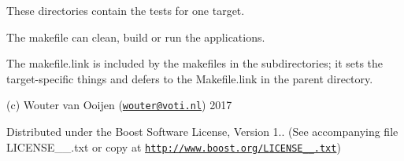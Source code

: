 These directories contain the tests for one target.

The makefile can clean, build or run the applications.

The makefile.\+link is included by the makefiles in the subdirectories; it sets the target-\/specific things and defers to the Makefile.\+link in the parent directory.

(c) Wouter van Ooijen (\href{mailto:wouter@voti.nl}{\tt wouter@voti.\+nl}) 2017

Distributed under the Boost Software License, Version 1.. (See accompanying file L\+I\+C\+E\+N\+S\+E\+\_\+\_.\+txt or copy at \href{http://www.boost.org/LICENSE_1_0.txt}{\tt http\+://www.\+boost.\+org/\+L\+I\+C\+E\+N\+S\+E\+\_\+\_.\+txt}) 